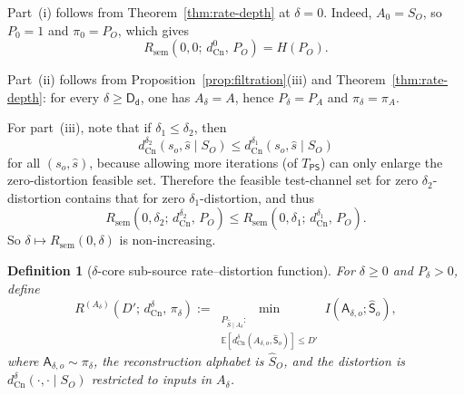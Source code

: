 \documentclass[journal,onecolumn]{IEEEtran}
\makeatletter
\newcommand{\Cn}{\text{Cn}}
\newcommand{\E}{\mathbb{E}}
\newtheorem{definition}{Definition}[section]
\numberwithin{equation}{section}
\renewenvironment{proof}[1][\proofname]{\par
  \pushQED{\qed}%
  \normalfont \topsep6\p@\@plus6\p@\relax
  \trivlist
  \item[\hskip\labelsep
        \itshape
    #1\@addpunct{.}]\ignorespaces
}{%
  \popQED\endtrivlist\@endpefalse
}
\makeatother
\begin{document}
\begin{proof}
Part~\textup{(i)} follows from Theorem~\ref{thm:rate-depth} at
\(\delta=0\). Indeed, \(A_0=S_O\), so \(P_0=1\) and
\(\pi_0=P_O\), which gives
\[
  R_{\mathrm{sem}}(0,0;\,d_{\Cn}^{0},\,P_O)=H(P_O).
\]

Part~\textup{(ii)} follows from
Proposition~\ref{prop:filtration}\textup{(iii)} and
Theorem~\ref{thm:rate-depth}: for every \(\delta\ge \mathsf{D_d}\),
one has \(A_\delta=A\), hence \(P_\delta=P_A\) and
\(\pi_\delta=\pi_A\).

For part~\textup{(iii)}, note that if \(\delta_1\le \delta_2\), then
\[
  d_{\Cn}^{\delta_2}(s_o,\hat s\mid S_O)
  \le
  d_{\Cn}^{\delta_1}(s_o,\hat s\mid S_O)
\]
for all \((s_o,\hat s)\), because allowing more iterations (of \(T_{\mathsf{PS}}\)) can
only enlarge the zero-distortion feasible set. Therefore the feasible
test-channel set for zero \(\delta_2\)-distortion contains that for
zero \(\delta_1\)-distortion, and thus
\[
  R_{\mathrm{sem}}(0,\delta_2;\,d_{\Cn}^{\delta_2},\,P_O)
  \le
  R_{\mathrm{sem}}(0,\delta_1;\,d_{\Cn}^{\delta_1},\,P_O).
\]
So \(\delta\mapsto R_{\mathrm{sem}}(0,\delta)\) is non-increasing.
\end{proof}

\begin{definition}[\(\delta\)-core sub-source rate--distortion function]
\label{def:delta-core-rd}
For \(\delta\ge 0\) and \(P_\delta>0\), define
\begin{equation}\label{eq:delta-core-rd}
  R^{(A_\delta)}(D';\,d_{\Cn}^{\delta},\,\pi_\delta)
  :=
  \min_{\substack{P_{\hat S\mid A_\delta}:\\
  \E[d_{\Cn}^{\delta}(A_{\delta,o},\hat {\mathsf{S}}_o)]\le D'}}
  I(\mathsf{A}_{\delta,o};\hat{\mathsf{S}}_o),
\end{equation}
where \(\mathsf{A}_{\delta,o}\sim\pi_\delta\), the reconstruction
alphabet is \(\hat S_O\), and the distortion is
\(d_{\Cn}^{\delta}(\cdot,\cdot\mid S_O)\) restricted to inputs in
\(A_\delta\).
\end{definition}
\end{document}
